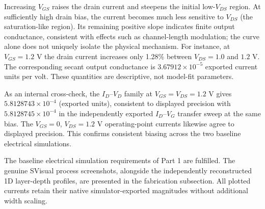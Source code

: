 Increasing $V_{GS}$ raises the drain current and steepens the initial
low-$V_{DS}$ region. At sufficiently high drain bias, the current
becomes much less sensitive to $V_{DS}$ (the saturation-like region).
Its remaining positive slope indicates finite output conductance,
consistent with effects such as channel-length modulation; the curve
alone does not uniquely isolate the physical mechanism.
For instance, at $V_{GS}=1.2$ V the drain current increases only
1.28\% between $V_{DS}=1.0$ and $1.2$ V. The corresponding secant
output conductance is $3.67912\times10^{-5}$ exported current units
per volt. These quantities are descriptive, not model-fit parameters.

As an internal cross-check, the $I_D$--$V_D$ family at
$V_{GS}=V_{DS}=1.2$ V gives $5.8128743\times10^{-4}$
(exported units), consistent to displayed precision with
$5.8128745\times10^{-4}$ in the independently exported $I_D$--$V_G$
transfer sweep at the same bias. The $V_{GS}=0$, $V_{DS}=1.2$ V
operating-point currents likewise agree to displayed precision.
This confirms consistent biasing across the two baseline electrical
simulations.

The baseline electrical simulation requirements of Part 1 are
fulfilled. The genuine SVisual process screenshots, alongside the
independently reconstructed 1D layer-depth profiles, are presented
in the fabrication subsection. All plotted currents retain their
native simulator-exported magnitudes without additional width scaling.
